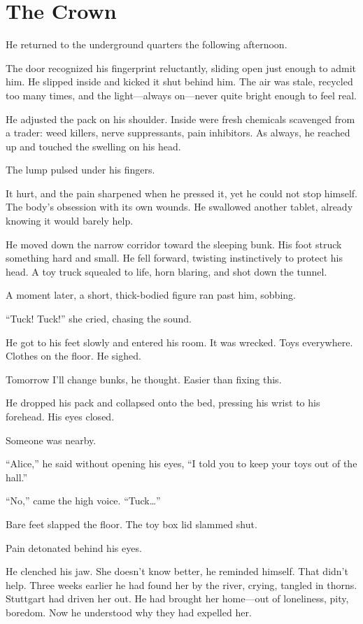 \chapter{The Crown}

He returned to the underground quarters the following afternoon.

The door recognized his fingerprint reluctantly, sliding open just enough to admit him. He slipped inside and kicked it shut behind him. The air was stale, recycled too many times, and the light—always on—never quite bright enough to feel real.

He adjusted the pack on his shoulder. Inside were fresh chemicals scavenged from a trader: weed killers, nerve suppressants, pain inhibitors. As always, he reached up and touched the swelling on his head.

The lump pulsed under his fingers.

It hurt, and the pain sharpened when he pressed it, yet he could not stop himself. The body’s obsession with its own wounds. He swallowed another tablet, already knowing it would barely help.

He moved down the narrow corridor toward the sleeping bunk. His foot struck something hard and small. He fell forward, twisting instinctively to protect his head. A toy truck squealed to life, horn blaring, and shot down the tunnel.

A moment later, a short, thick-bodied figure ran past him, sobbing.

“Tuck! Tuck!” she cried, chasing the sound.

He got to his feet slowly and entered his room. It was wrecked. Toys everywhere. Clothes on the floor. He sighed.

Tomorrow I’ll change bunks, he thought. Easier than fixing this.

He dropped his pack and collapsed onto the bed, pressing his wrist to his forehead. His eyes closed.

Someone was nearby.

“Alice,” he said without opening his eyes, “I told you to keep your toys out of the hall.”

“No,” came the high voice. “Tuck…”

Bare feet slapped the floor. The toy box lid slammed shut.

Pain detonated behind his eyes.

He clenched his jaw. She doesn’t know better, he reminded himself. That didn’t help. Three weeks earlier he had found her by the river, crying, tangled in thorns. Stuttgart had driven her out. He had brought her home—out of loneliness, pity, boredom. Now he understood why they had expelled her.

